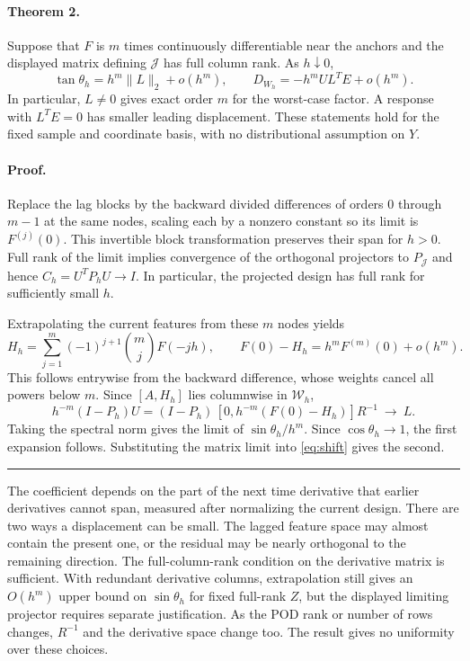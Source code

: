 \documentclass[11pt,a4paper]{article}
\begin{document}
\paragraph{Theorem 2.} Suppose that $F$ is $m$ times continuously differentiable near the anchors and the displayed matrix defining $\mathcal J$ has full column rank. As $h\downarrow0$,
\begin{equation}
 \tan\theta_h=h^m\|L\|_2+o(h^m),\qquad
 D_{W_h}=-h^m U L^TE+o(h^m). \label{eq:limit}
\end{equation}
In particular, $L\ne0$ gives exact order $m$ for the worst-case factor. A response with $L^TE=0$ has smaller leading displacement. These statements hold for the fixed sample and coordinate basis, with no distributional assumption on $Y$.

\paragraph{Proof.} Replace the lag blocks by the backward divided differences of orders $0$ through $m-1$ at the same nodes, scaling each by a nonzero constant so its limit is $F^{(j)}(0)$. This invertible block transformation preserves their span for $h>0$. Full rank of the limit implies convergence of the orthogonal projectors to $P_{\mathcal J}$ and hence $C_h=U^TP_hU\to I$. In particular, the projected design has full rank for sufficiently small $h$.

Extrapolating the current features from these $m$ nodes yields
\[
 H_h=\sum_{j=1}^m(-1)^{j+1}\binom{m}{j}F(-jh),
 \qquad F(0)-H_h=h^m F^{(m)}(0)+o(h^m).
\]
This follows entrywise from the backward difference, whose weights cancel all powers below $m$. Since $[A,H_h]$ lies columnwise in $\mathcal W_h$,
\[
 h^{-m}(I-P_h)U
  =(I-P_h)\,[0,h^{-m}(F(0)-H_h)]R^{-1}\ \longrightarrow\ L .
\]
Taking the spectral norm gives the limit of $\sin\theta_h/h^m$. Since $\cos\theta_h\to1$, the first expansion follows. Substituting the matrix limit into \eqref{eq:shift} gives the second. \hfill\rule{1ex}{1ex}

The coefficient depends on the part of the next time derivative that earlier derivatives cannot span, measured after normalizing the current design. There are two ways a displacement can be small. The lagged feature space may almost contain the present one, or the residual may be nearly orthogonal to the remaining direction. The full-column-rank condition on the derivative matrix is sufficient. With redundant derivative columns, extrapolation still gives an $O(h^m)$ upper bound on $\sin\theta_h$ for fixed full-rank $Z$, but the displayed limiting projector requires separate justification. As the POD rank or number of rows changes, $R^{-1}$ and the derivative space change too. The result gives no uniformity over these choices.
\end{document}
